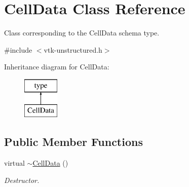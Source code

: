 \hypertarget{classCellData}{\section{Cell\+Data Class Reference}
\label{classCellData}
}


Class corresponding to the Cell\+Data schema type.  




{\ttfamily \#include $<$vtk-\/unstructured.\+h$>$}

Inheritance diagram for Cell\+Data\+:\begin{figure}[H]
\begin{center}
\leavevmode
\includegraphics[height=2.000000cm]{classCellData}
\end{center}
\end{figure}
\subsection*{Public Member Functions}
\begin{DoxyCompactItemize}
\item 
virtual \hyperlink{classCellData_aaf439852120aadb5a267799e2a7bf2a3}{$\sim$\+Cell\+Data} ()
\begin{DoxyCompactList}\small\item\em Destructor. \end{DoxyCompactList}\end{DoxyCompactItemize}
